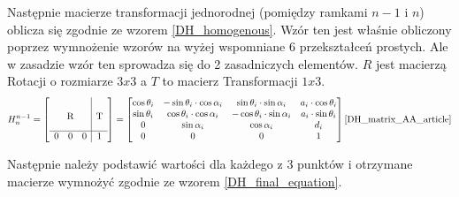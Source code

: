 \documentclass[a4paper,13pt]{article}
\begin{document}
Następnie macierze transformacji jednorodnej (pomiędzy ramkami $n-1$ i $n$) oblicza się zgodnie ze wzorem \ref{DH_homogenous}. Wzór ten jest właśnie obliczony poprzez wymnożenie wzorów na wyżej wspomniane 6 przekształceń prostych. Ale w zasadzie wzór ten sprowadza się do 2 zasadniczych elementów. $R$ jest macierzą Rotacji o rozmiarze $3x3$ a $T$ to macierz Transformacji $1x3$. \\

\begin{equation} \label{DH_homogenous}
H^{n-1}_n = 
\left[\begin{array}{ccc|c}
&&&\\
&&&\\
\multicolumn{3}{c|}{\smash{\raisebox{0.75\normalbaselineskip}{R}}} & \smash{\raisebox{0.75\normalbaselineskip}{T}}\\
\hline
0 & 0 & 0 & 1\\
\end{array}\right] = 
\left[\begin{matrix}
\cos{\theta_i} & -\sin{\theta_i} \cdot \cos{\alpha_i} & \sin{\theta_i} \cdot \sin{\alpha_i} & a_i \cdot \cos{\theta_i}\\
\sin{\theta_i} & \cos{\theta_i} \cdot \cos{\alpha_i} & -\cos{\theta_i} \cdot \sin{\alpha_i} & a_i \cdot \sin{\theta_i}\\
0 & \sin{\alpha_i} & \cos{\alpha_i} & d_i\\
0 & 0 & 0 & 1\\
\end{matrix}\right]\cite{DH_matrix_AA_article}
\end{equation}


Następnie należy podstawić wartości dla każdego z 3 punktów i otrzymane macierze wymnożyć zgodnie ze wzorem \ref{DH_final_equation}.
\end{document}
